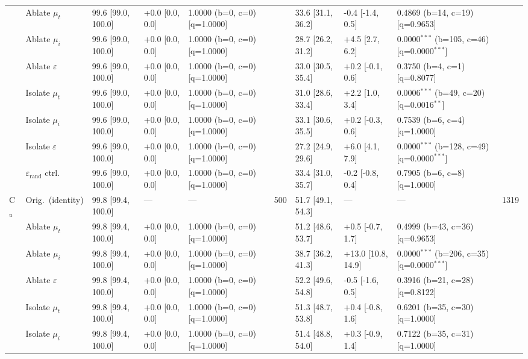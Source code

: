 \begin{table}[h!]
\begin{tabular}{ll lllc lllc}
 & Ablate $\mu_t$ & 99.6 [99.0, 100.0] & +0.0 [0.0, 0.0] & 1.0000 (b=0, c=0) [q=1.0000] &  & 33.6 [31.1, 36.2] & -0.4 [-1.4, 0.5] & 0.4869 (b=14, c=19) [q=0.9653] &  \\
 & Ablate $\mu_i$ & 99.6 [99.0, 100.0] & +0.0 [0.0, 0.0] & 1.0000 (b=0, c=0) [q=1.0000] &  & 28.7 [26.2, 31.2] & +4.5 [2.7, 6.2] & 0.0000$^{***}$ (b=105, c=46) [q=0.0000$^{***}$] &  \\
 & Ablate $\varepsilon$ & 99.6 [99.0, 100.0] & +0.0 [0.0, 0.0] & 1.0000 (b=0, c=0) [q=1.0000] &  & 33.0 [30.5, 35.4] & +0.2 [-0.1, 0.6] & 0.3750 (b=4, c=1) [q=0.8077] &  \\
 & Isolate $\mu_t$ & 99.6 [99.0, 100.0] & +0.0 [0.0, 0.0] & 1.0000 (b=0, c=0) [q=1.0000] &  & 31.0 [28.6, 33.4] & +2.2 [1.0, 3.4] & 0.0006$^{***}$ (b=49, c=20) [q=0.0016$^{**}$] &  \\
 & Isolate $\mu_i$ & 99.6 [99.0, 100.0] & +0.0 [0.0, 0.0] & 1.0000 (b=0, c=0) [q=1.0000] &  & 33.1 [30.6, 35.5] & +0.2 [-0.3, 0.6] & 0.7539 (b=6, c=4) [q=1.0000] &  \\
 & Isolate $\varepsilon$ & 99.6 [99.0, 100.0] & +0.0 [0.0, 0.0] & 1.0000 (b=0, c=0) [q=1.0000] &  & 27.2 [24.9, 29.6] & +6.0 [4.1, 7.9] & 0.0000$^{***}$ (b=128, c=49) [q=0.0000$^{***}$] &  \\
 & $\varepsilon_\mathrm{rand}$ ctrl. & 99.6 [99.0, 100.0] & +0.0 [0.0, 0.0] & 1.0000 (b=0, c=0) [q=1.0000] &  & 33.4 [31.0, 35.7] & -0.2 [-0.8, 0.4] & 0.7905 (b=6, c=8) [q=1.0000] &  \\
\cmidrule(lr){2-10}
\multirow{8}{*}{C$_u$} & Orig.\ (identity) & 99.8 [99.4, 100.0] & --- & --- & 500 & 51.7 [49.1, 54.3] & --- & --- & 1319 \\
 & Ablate $\mu_t$ & 99.8 [99.4, 100.0] & +0.0 [0.0, 0.0] & 1.0000 (b=0, c=0) [q=1.0000] &  & 51.2 [48.6, 53.7] & +0.5 [-0.7, 1.7] & 0.4999 (b=43, c=36) [q=0.9653] &  \\
 & Ablate $\mu_i$ & 99.8 [99.4, 100.0] & +0.0 [0.0, 0.0] & 1.0000 (b=0, c=0) [q=1.0000] &  & 38.7 [36.2, 41.3] & +13.0 [10.8, 14.9] & 0.0000$^{***}$ (b=206, c=35) [q=0.0000$^{***}$] &  \\
 & Ablate $\varepsilon$ & 99.8 [99.4, 100.0] & +0.0 [0.0, 0.0] & 1.0000 (b=0, c=0) [q=1.0000] &  & 52.2 [49.6, 54.8] & -0.5 [-1.6, 0.5] & 0.3916 (b=21, c=28) [q=0.8122] &  \\
 & Isolate $\mu_t$ & 99.8 [99.4, 100.0] & +0.0 [0.0, 0.0] & 1.0000 (b=0, c=0) [q=1.0000] &  & 51.3 [48.7, 53.8] & +0.4 [-0.8, 1.6] & 0.6201 (b=35, c=30) [q=1.0000] &  \\
 & Isolate $\mu_i$ & 99.8 [99.4, 100.0] & +0.0 [0.0, 0.0] & 1.0000 (b=0, c=0) [q=1.0000] &  & 51.4 [48.8, 54.0] & +0.3 [-0.9, 1.4] & 0.7122 (b=35, c=31) [q=1.0000] &  \\

\end{tabular}
\end{table}
